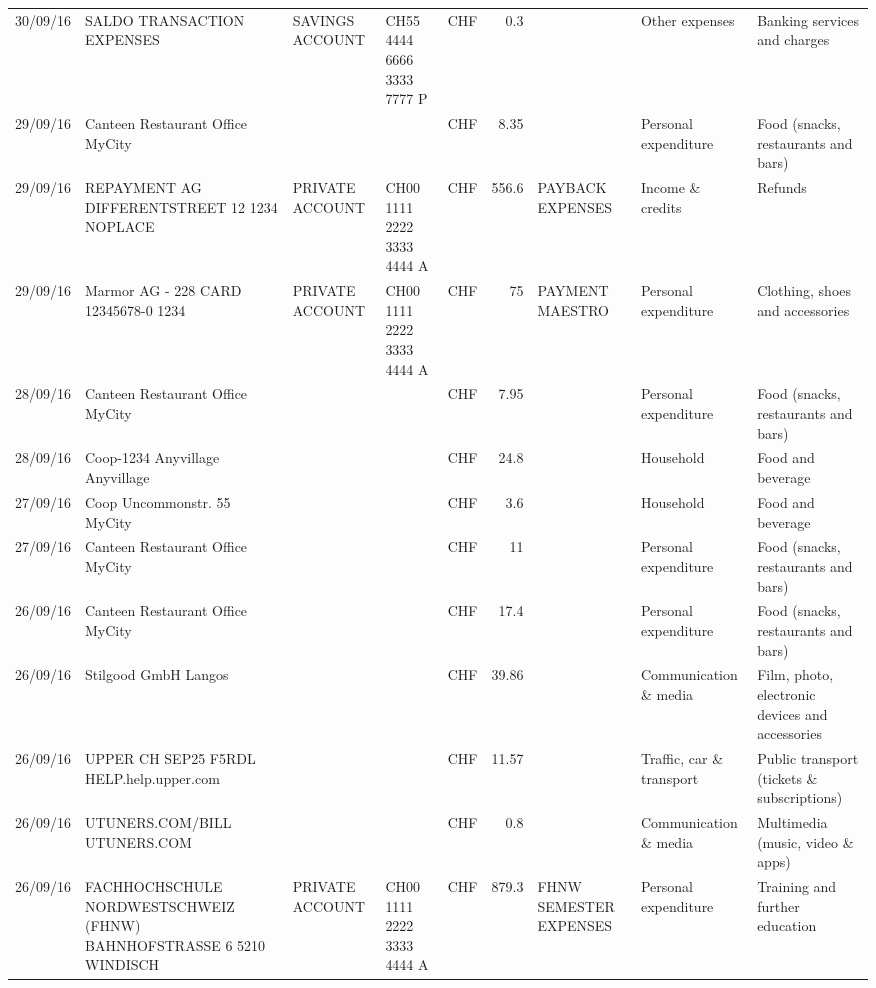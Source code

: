 \begin{landscape}
\begin{table}[h]
\begin{center}
\begin{tabular}{rllllrlll}
		30/09/16 & SALDO TRANSACTION EXPENSES & SAVINGS ACCOUNT & CH55 4444 6666 3333 7777 P & CHF   & 0.3   &       & Other expenses & Banking services and charges \\
		29/09/16 & Canteen Restaurant Office      MyCity &       &       & CHF   & 8.35  &       & Personal expenditure & Food (snacks, restaurants and bars) \\
		29/09/16 & REPAYMENT AG DIFFERENTSTREET 12 1234 NOPLACE & PRIVATE ACCOUNT & CH00 1111 2222 3333 4444 A & CHF   & 556.6 & PAYBACK EXPENSES & Income \& credits & Refunds \\
		29/09/16 & Marmor AG - 228 CARD 12345678-0 1234 & PRIVATE ACCOUNT & CH00 1111 2222 3333 4444 A & CHF   & 75    & PAYMENT MAESTRO & Personal expenditure & Clothing, shoes and accessories \\
		28/09/16 & Canteen Restaurant Office      MyCity &       &       & CHF   & 7.95  &       & Personal expenditure & Food (snacks, restaurants and bars) \\
		28/09/16 & Coop-1234 Anyvillage    Anyvillage &       &       & CHF   & 24.8  &       & Household & Food and beverage \\
		27/09/16 & Coop Uncommonstr. 55   MyCity &       &       & CHF   & 3.6   &       & Household & Food and beverage \\
		27/09/16 & Canteen Restaurant Office      MyCity &       &       & CHF   & 11    &       & Personal expenditure & Food (snacks, restaurants and bars) \\
		26/09/16 & Canteen Restaurant Office      MyCity &       &       & CHF   & 17.4  &       & Personal expenditure & Food (snacks, restaurants and bars) \\
		26/09/16 & Stilgood GmbH             Langos &       &       & CHF   & 39.86 &       & Communication \& media & Film, photo, electronic devices and accessories \\
		26/09/16 & UPPER CH SEP25 F5RDL HELP.help.upper.com &       &       & CHF   & 11.57 &       & Traffic, car \& transport & Public transport (tickets \& subscriptions) \\
		26/09/16 & UTUNERS.COM/BILL          UTUNERS.COM &       &       & CHF   & 0.8   &       & Communication \& media & Multimedia (music, video \& apps) \\
		26/09/16 & FACHHOCHSCHULE NORDWESTSCHWEIZ (FHNW) BAHNHOFSTRASSE 6 5210 WINDISCH & PRIVATE ACCOUNT & CH00 1111 2222 3333 4444 A & CHF   & 879.3 & FHNW SEMESTER EXPENSES & Personal expenditure & Training and further education \\

\end{tabular}
\end{center}
\end{table}
\end{landscape}
